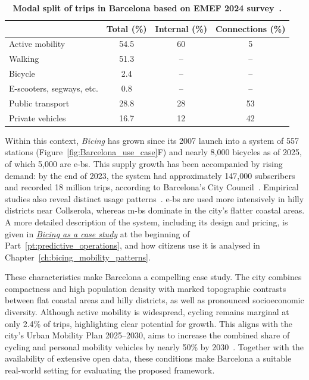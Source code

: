 \begin{table}[!htbp]
    \centering
    \caption[Modal split of trips in Barcelona based on EMEF 2024 survey]{
        \textbf{Modal split of trips in Barcelona based on EMEF 2024 survey~\cite{EMEF2024}.}
    }
    \label{tab:modal_split}
    \begin{tabular}{lccc}
        \hline
        & \textbf{Total (\%)} & \textbf{Internal (\%)} & \textbf{Connections (\%)} \\
        \hline
        Active mobility & 54.5 & 60 & 5 \\
        \quad Walking & 51.3 & -- & -- \\
        \quad Bicycle & 2.4 & -- & -- \\
        \quad E-scooters, segways, etc. & 0.8 & -- & -- \\
        Public transport & 28.8 & 28 & 53 \\
        Private vehicles & 16.7 & 12 & 42 \\
        \hline
    \end{tabular}
\end{table}

Within this context, \textit{Bicing} has grown since its 2007 launch into a system of 557 stations (Figure~\ref{fig:Barcelona_use_case}F) and nearly 8,000 bicycles as of 2025, of which 5,000 are \acp{e-b}. This supply growth has been accompanied by rising demand: by the end of 2023, the system had approximately 147,000 subscribers and recorded 18 million trips, according to Barcelona's City Council~\cite{AjuntamentBarcelona2024_Bicing}. Empirical studies also reveal distinct usage patterns~\cite{Grau-Escolano2024}. \acp{e-b} are used more intensively in hilly districts near Collserola, whereas \acp{m-b} dominate in the city's flatter coastal areas. A more detailed description of the system, including its design and pricing, is given in \hyperref[ch:use_case_bicing]{\textit{Bicing as a case study}} at the beginning of Part~\ref{pt:predictive_operations}, and how citizens use it is analysed in Chapter~\ref{ch:bicing_mobility_patterns}.

These characteristics make Barcelona a compelling case study. The city combines compactness and high population density with marked topographic contrasts between flat coastal areas and hilly districts, as well as pronounced socioeconomic diversity. Although active mobility is widespread, cycling remains marginal at only 2.4\% of trips, highlighting clear potential for growth. This aligns with the city's Urban Mobility Plan 2025--2030, aims to increase the combined share of cycling and personal mobility vehicles by nearly 50\% by 2030~\cite{PMU2025}. Together with the availability of extensive open data, these conditions make Barcelona a suitable real-world setting for evaluating the proposed framework.


\endgroup